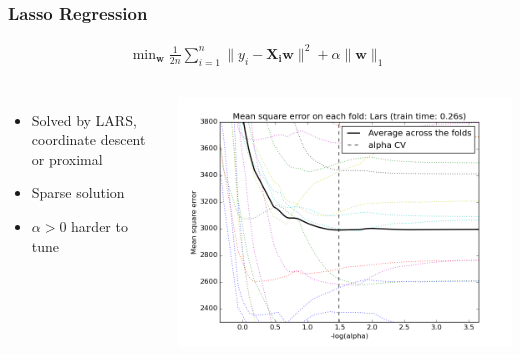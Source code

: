 \begin{frame}
\frametitle{Lasso Regression}

\begin{align*}
\text{min}_{\mathbf{w}} \; \frac{1}{2n} \sum_{i=1}^n \|y_i - \mathbf{X_i}\mathbf{w}\|^2 + \alpha \|\mathbf{w}\|_1
\end{align*}

\begin{columns}
\begin{itemize}
\item Solved by LARS, coordinate descent or proximal
\item Sparse solution
\item $\alpha > 0$ harder to tune
\end{itemize}
\includegraphics[width=\textwidth]{sklearn_material/plot_lasso_model_selection_003.png}

\end{columns}
\end{frame}


